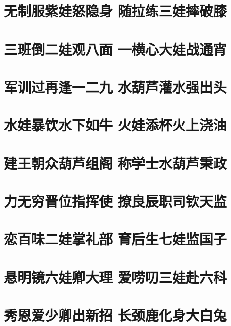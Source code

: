 \documentclass[12pt, a4paper]{book}
\begin{document}
\begin{CJK}{UTF8}{gbsn}
    \chapter{无制服紫娃怒隐身 随拉练三娃摔破膝}

    \chapter{三班倒二娃观八面 一横心大娃战通宵}

    \chapter{军训过再逢一二九 水葫芦灌水强出头}

    \chapter{水娃暴饮水下如牛 火娃添杯火上浇油}
    
    \chapter{建王朝众葫芦组阁 称学士水葫芦秉政}
    
    \chapter{力无穷晋位指挥使 撩良辰职司钦天监}
    
    \chapter{恋百味二娃掌礼部 育后生七娃监国子}
    
    \chapter{悬明镜六娃卿大理 爱唠叨三娃赴六科}
    
    \chapter{秀恩爱少卿出新招 长颈鹿化身大白兔}

    \appendix

    

\end{CJK}
\end{document}
